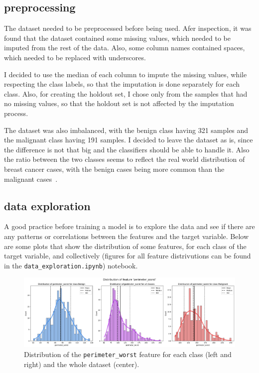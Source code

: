 \documentclass[12pt]{article}
\begin{document}
\subsection{preprocessing}

The dataset needed to be preprocessed before being used. Afer inspection, it was
found that the dataset contained some missing values, which needed to be
imputed from the rest of the data. Also, some column names contained spaces,
which needed to be replaced with underscores.

I decided to use the median of each column to impute the missing values, while
respecting the class labels, so that the imputation is done separately for each
class. Also, for creating the holdout set, I chose only from the samples that
had no missing values, so that the holdout set is not affected by the imputation
process.

The dataset was also imbalanced, with the benign class having 321 samples and
the malignant class having 191 samples. I decided to leave the dataset as is,
since the difference is not that big and the classifiers should be able to
handle it. Also the ratio between the two classes seems to reflect the real
world distribution of breast cancer cases, with the benign cases being more
common than the malignant cases~\cite{%
Ugiagbe_Olu-Eddo_2011,Bhathal_Brown_Lesueur_Russell_1985}.


\subsection{data exploration}

A good practice before training a model is to explore the data and see if there
are any patterns or correlations between the features and the target variable.
Below are some plots that show the distribution of some features, for each class
of the target variable, and collectively (figures for all feature distrivutions
can be found in the \texttt{data\_exploration.ipynb}) notebook.

\begin{figure}[H]
    \centering
    \includegraphics[width=\textwidth]{ims/perimeter_worst.png}
    \caption{Distribution of the \texttt{perimeter\_worst} feature for each
    class (left and right) and the whole dataset (center).}
    \label{fig:perimeter_worst}
\end{figure}
\end{document}
